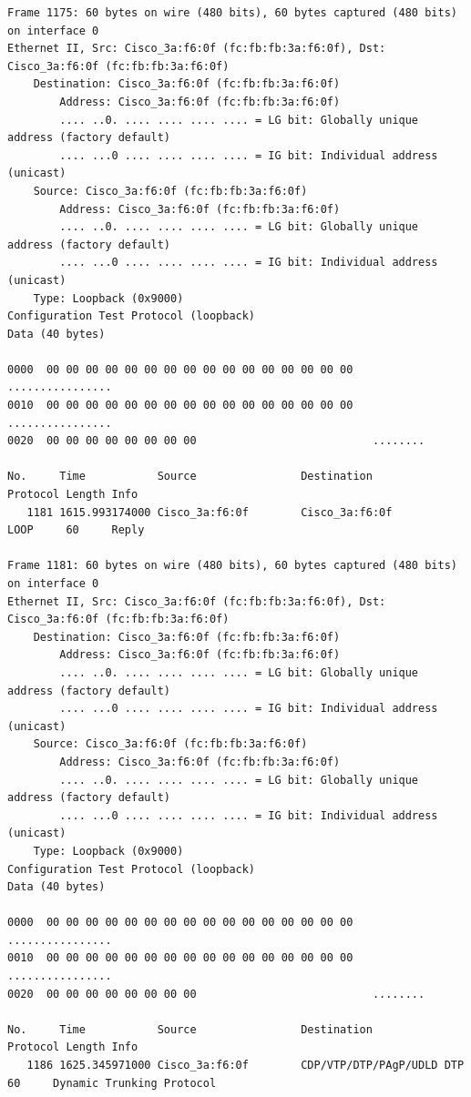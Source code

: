 \documentclass[a4paper,11pt]{article}
\begin{document}
\begin{lstlisting}
Frame 1175: 60 bytes on wire (480 bits), 60 bytes captured (480 bits) on interface 0
Ethernet II, Src: Cisco_3a:f6:0f (fc:fb:fb:3a:f6:0f), Dst: Cisco_3a:f6:0f (fc:fb:fb:3a:f6:0f)
    Destination: Cisco_3a:f6:0f (fc:fb:fb:3a:f6:0f)
        Address: Cisco_3a:f6:0f (fc:fb:fb:3a:f6:0f)
        .... ..0. .... .... .... .... = LG bit: Globally unique address (factory default)
        .... ...0 .... .... .... .... = IG bit: Individual address (unicast)
    Source: Cisco_3a:f6:0f (fc:fb:fb:3a:f6:0f)
        Address: Cisco_3a:f6:0f (fc:fb:fb:3a:f6:0f)
        .... ..0. .... .... .... .... = LG bit: Globally unique address (factory default)
        .... ...0 .... .... .... .... = IG bit: Individual address (unicast)
    Type: Loopback (0x9000)
Configuration Test Protocol (loopback)
Data (40 bytes)

0000  00 00 00 00 00 00 00 00 00 00 00 00 00 00 00 00   ................
0010  00 00 00 00 00 00 00 00 00 00 00 00 00 00 00 00   ................
0020  00 00 00 00 00 00 00 00                           ........

No.     Time           Source                Destination           Protocol Length Info
   1181 1615.993174000 Cisco_3a:f6:0f        Cisco_3a:f6:0f        LOOP     60     Reply

Frame 1181: 60 bytes on wire (480 bits), 60 bytes captured (480 bits) on interface 0
Ethernet II, Src: Cisco_3a:f6:0f (fc:fb:fb:3a:f6:0f), Dst: Cisco_3a:f6:0f (fc:fb:fb:3a:f6:0f)
    Destination: Cisco_3a:f6:0f (fc:fb:fb:3a:f6:0f)
        Address: Cisco_3a:f6:0f (fc:fb:fb:3a:f6:0f)
        .... ..0. .... .... .... .... = LG bit: Globally unique address (factory default)
        .... ...0 .... .... .... .... = IG bit: Individual address (unicast)
    Source: Cisco_3a:f6:0f (fc:fb:fb:3a:f6:0f)
        Address: Cisco_3a:f6:0f (fc:fb:fb:3a:f6:0f)
        .... ..0. .... .... .... .... = LG bit: Globally unique address (factory default)
        .... ...0 .... .... .... .... = IG bit: Individual address (unicast)
    Type: Loopback (0x9000)
Configuration Test Protocol (loopback)
Data (40 bytes)

0000  00 00 00 00 00 00 00 00 00 00 00 00 00 00 00 00   ................
0010  00 00 00 00 00 00 00 00 00 00 00 00 00 00 00 00   ................
0020  00 00 00 00 00 00 00 00                           ........

No.     Time           Source                Destination           Protocol Length Info
   1186 1625.345971000 Cisco_3a:f6:0f        CDP/VTP/DTP/PAgP/UDLD DTP      60     Dynamic Trunking Protocol


\end{lstlisting}
\end{document}
